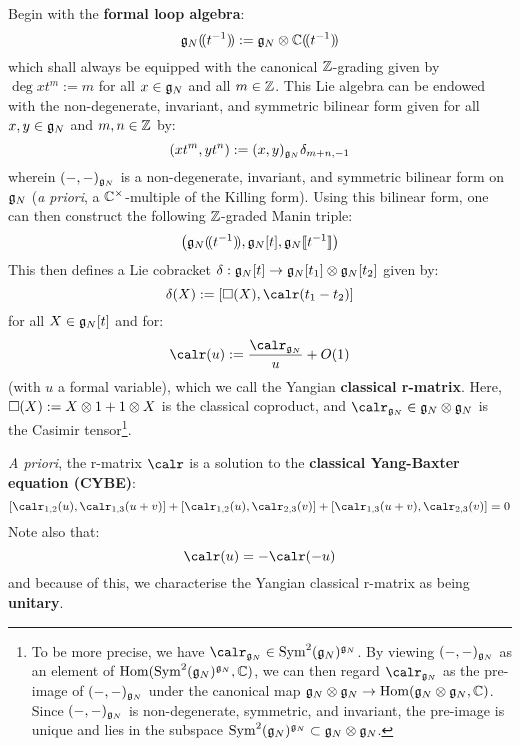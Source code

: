         Begin with the \textbf{formal loop algebra}:
            $$\g_N(\!(t^{-1})\!) := \g_N \tensor \bbC(\!(t^{-1})\!)$$
        which shall always be equipped with the canonical $\mathbb{Z}$-grading given by $\deg xt^m := m$ for all $x \in \mathfrak{g}_N$ and all $m \in \mathbb{Z}$. This Lie algebra can be endowed with the non-degenerate, invariant, and symmetric bilinear form given for all $x, y \in \mathfrak{g}_N$ and $m, n \in \mathbb{Z}$ by:
            $$(xt^m, yt^n) := (x, y)_{\mathfrak{g}_N} \delta_{m + n, -1}$$
        wherein $(-, -)_{\mathfrak{g}_N}$ is a non-degenerate, invariant, and symmetric bilinear form on $\mathfrak{g}_N$ (\textit{a priori}, a $\bbC^{\x}$-multiple of the Killing form). Using this bilinear form, one can then construct the following $\mathbb{Z}$-graded Manin triple:
            $$\left( \mathfrak{g}_N(\!(t^{-1})\!), \mathfrak{g}_N[t], \mathfrak{g}_N[\![t^{-1}]\!] \right)$$
        This then defines a Lie cobracket $\delta: \g_N[t] \to \g_N[t_1] \tensor \g_N[t_2]$ given by:
            $$\delta( X ) := [\Box(X), \calr(t_1 - t_2)]$$
        for all $X \in \mathfrak{g}_N[t]$ and for:
            $$\calr(u) := \frac{\calr_{\g_N}}{u} + O(1)$$
        (with $u$ a formal variable), which we call the Yangian \textbf{classical r-matrix}. Here, $\Box(X) := X \tensor 1 + 1 \tensor X$ is the  classical coproduct, and $\calr_{\g_N} \in \g_N \tensor \g_N$ is the Casimir tensor\footnote{To be more precise, we have $\calr_{\g_N} \in \Sym^2(\g_N)^{\g_N}$. By viewing $(-, -)_{\mathfrak{g}_N}$ as an element of $\operatorname{Hom}( \operatorname{Sym}^2(\mathfrak{g}_N)^{\mathfrak{g}_N}, \mathbb{C} )$, we can then regard $\calr_{\g_N}$ as the pre-image of $(-, -)_{\mathfrak{g}_N}$ under the canonical map $\g_N \tensor \g_N \to \Hom(\g_N \tensor \g_N, \bbC)$. Since $(-, -)_{\mathfrak{g}_N}$ is non-degenerate, symmetric, and invariant, the pre-image is unique and lies in the subspace $\Sym^2(\g_N)^{\g_N} \subset \g_N \tensor \g_N$.}.
        
        \textit{A priori}, the r-matrix $\calr$ is a solution to the \textbf{classical Yang-Baxter equation (CYBE)}:
            \begin{equation} \label{equation: CYBE}
                [\calr_{1, 2}(u), \calr_{1, 3}(u + v)] + [\calr_{1, 2}(u), \calr_{2, 3}(v)] + [\calr_{1, 3}(u + v), \calr_{2, 3}(v)] = 0
            \end{equation}
        Note also that:
            \begin{equation} \label{equation: classical_unitarity}
                \calr(u) = -\calr(-u)
            \end{equation}
        and because of this, we characterise the Yangian classical r-matrix as being \textbf{unitary}.
        
